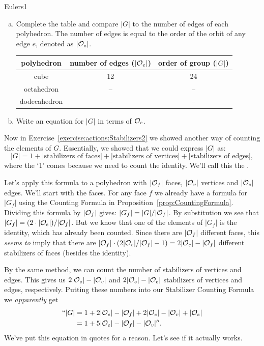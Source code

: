 \begin {exercise}{Eulers1}
\begin {enumerate}[(a)]
\item
Complete the table and compare $|G|$ to the number of edges of each polyhedron.  The number of edges is equal to the order of the orbit of any edge $e$, denoted as $|{\cal O}_e|$.

\begin{tabular}{|c | c | c|}\hline
polyhedron & number of edges ($|{\cal O}_e|$) & order of group ($|G|$)\\ \hline
cube &  12 &   24\\ \hline
octahedron & -- &--\\ \hline
dodecahedron &  --&--\\ \hline 
\end{tabular}
\item Write an equation for $|G|$ in terms of ${\cal O}_e$.
\end{enumerate}
\end {exercise}
 Now in Exercise~\ref{exercise:actions:Stabilizers2} we showed another way of counting the elements of $G$. Essentially, we showed that we could express $|G|$ as:
\[ |G| = 1 + |\text{stabilizers of faces}| + |\text{stabilizers of vertices}| + |\text{stabilizers of edges}|, \]
where the `1' comes because we need to count the identity.
We'll call this the .

Let's apply this formula to a polyhedron with $|{\cal O}_f|$ faces, $|{\cal O}_v|$ vertices and $|{\cal O}_e|$ edges.  
We'll start with the faces.   For any face $f$ we already have a formula for $|G_f|$  using the Counting Formula in Proposition~\ref{prop:CountingFormula}. Dividing this formula by $|{\cal O}_f|$ gives:  $|G_f|=|G|/|{\cal O}_f|$.  By substitution we see that $|G_f|=(2\cdot|{\cal O}_e|)/|{\cal O}_f|$. But we know that one of the elements of $|G_f|$ is the identity, which has already been counted.    Since there are $|{\cal O}_f|$ different faces, this\emph{ seems to} imply that there are  $|{\cal O}_f|\cdot (2|{\cal O}_e|/|{\cal O}_f|-1)= 2|{\cal O}_e|-|{\cal O}_f|$ different stabilizers of faces (besides the identity). 

 By the same method, we can count the number of stabilizers of vertices and edges. This gives us $2|{\cal O}_e|-|{\cal O}_v|$ and $2|{\cal O}_e|-|{\cal O}_e|$ stabilizers of vertices and edges, respectively.  Putting these numbers into our Stabilizer Counting Formula we \emph {apparently} get
 \begin{align*}
``|G| &= 1+ 2|{\cal O}_e|-|{\cal O}_f|+ 2|{\cal O}_e|-|{\cal O}_v| +|{\cal O}_e| \\
&= 1+ 5|{\cal O}_e|-|{\cal O}_f|-|{\cal O}_v|''.
\end{align*}
We've put this equation in quotes for a reason.  Let's see if it actually works. 

